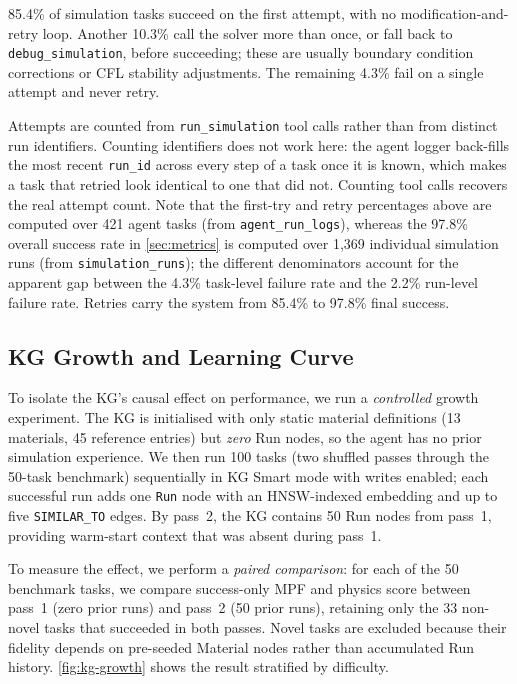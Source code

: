 \documentclass[preprint,review,12pt]{elsarticle}
\newif\ifrevisionsvisible
\newcommand{\revised}[1]{%
  \ifrevisionsvisible\textcolor{revisionred}{#1}\else#1\fi}
\begin{document}
\revised{85.4\% of simulation tasks succeed on the first attempt, with no
modification-and-retry loop.  Another 10.3\% call the solver more than
once, or fall back to \texttt{debug\_simulation}, before succeeding;
these are usually boundary condition corrections or CFL stability
adjustments.  The remaining 4.3\% fail on a single attempt and never
retry.}

\revised{Attempts are counted from \texttt{run\_simulation} tool calls rather
than from distinct run identifiers.  Counting identifiers does not work
here: the agent logger back-fills the most recent \texttt{run\_id} across
every step of a task once it is known, which makes a task that retried
look identical to one that did not.  Counting tool calls recovers the
real attempt count.  Note that the first-try and retry percentages above
are computed over 421 agent tasks (from \texttt{agent\_run\_logs}),
whereas the 97.8\% overall success rate in \cref{sec:metrics} is
computed over 1{,}369 individual simulation runs (from
\texttt{simulation\_runs}); the different denominators account for the
apparent gap between the 4.3\% task-level failure rate and the 2.2\%
run-level failure rate.  Retries carry the
system from 85.4\% to 97.8\% final success.}

\subsection{KG Growth and Learning Curve}
\label{sec:kg-growth}

To isolate the KG's causal effect on performance, we run a
\emph{controlled} growth experiment.  The KG is initialised with only
static material definitions (13 materials, 45 reference entries) but
\emph{zero} Run nodes, so the agent has no prior simulation experience.
We then run 100 tasks (two shuffled passes through the 50-task
benchmark) sequentially in KG Smart mode with writes enabled; each
successful run adds one \texttt{Run} node with an HNSW-indexed
embedding and up to five \texttt{SIMILAR\_TO} edges.  By pass~2, the
KG contains 50 Run nodes from pass~1, providing warm-start context
that was absent during pass~1.

To measure the effect, we perform a \emph{paired comparison}: for
each of the 50 benchmark tasks, we compare success-only MPF and
physics score between pass~1 (zero prior runs) and pass~2 (50 prior
runs), retaining only the 33 non-novel tasks that succeeded in both
passes.  Novel tasks are excluded because their fidelity depends on
pre-seeded Material nodes rather than accumulated Run history.
\cref{fig:kg-growth} shows the result stratified by difficulty.
\end{document}
